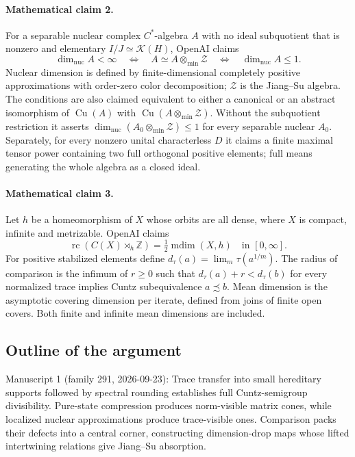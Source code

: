 \documentclass[11pt]{article}
\begin{document}
\paragraph{Mathematical claim 2.} For a separable nuclear complex $C^*$-algebra $A$ with no ideal subquotient that is nonzero and elementary $I/J\simeq\mathcal K(H)$, OpenAI claims
\[
\dim_{\mathrm{nuc}}A<\infty\quad\Longleftrightarrow\quad
A\simeq A\otimes_{\min}\mathcal Z\quad\Longleftrightarrow\quad\dim_{\mathrm{nuc}}A\le1.
\]
Nuclear dimension is defined by finite-dimensional completely positive approximations with order-zero color decomposition; $\mathcal Z$ is the Jiang--Su algebra. The conditions are also claimed equivalent to either a canonical or an abstract isomorphism of $\operatorname{Cu}(A)$ with $\operatorname{Cu}(A\otimes_{\min}\mathcal Z)$. Without the subquotient restriction it asserts $\dim_{\mathrm{nuc}}(A_0\otimes_{\min}\mathcal Z)\le1$ for every separable nuclear $A_0$. Separately, for every nonzero unital characterless $D$ it claims a finite maximal tensor power containing two full orthogonal positive elements; full means generating the whole algebra as a closed ideal.

\paragraph{Mathematical claim 3.} Let $h$ be a homeomorphism of $X$ whose orbits are all dense, where $X$ is compact, infinite and metrizable. OpenAI claims
\[
\operatorname{rc}(C(X)\rtimes_h\mathbb Z)=\tfrac12\operatorname{mdim}(X,h)\quad\text{in }[0,\infty].
\]
For positive stabilized elements define $d_\tau(a)=\lim_m\tau(a^{1/m})$. The radius of comparison is the infimum of $r\ge0$ such that $d_\tau(a)+r<d_\tau(b)$ for every normalized trace implies Cuntz subequivalence $a\precsim b$. Mean dimension is the asymptotic covering dimension per iterate, defined from joins of finite open covers. Both finite and infinite mean dimensions are included.

\subsection{Outline of the argument}
Manuscript 1 (family 291, 2026-09-23): Trace transfer into small hereditary supports followed by spectral rounding establishes full Cuntz-semigroup divisibility. Pure-state compression produces norm-visible matrix cones, while localized nuclear approximations produce trace-visible ones. Comparison packs their defects into a central corner, constructing dimension-drop maps whose lifted intertwining relations give Jiang--Su absorption.
\end{document}
